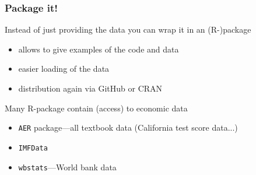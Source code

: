 \documentclass[ignorenonframetext]{beamer}
\begin{document}
\begin{frame}
  \frametitle{Package it!}
  Instead of just providing the data you can wrap it in an \alert{(R-)package}
  \begin{itemize}
    \item allows to give examples of the code and data
    \item easier loading of the data
    \item distribution again via \alert{GitHub} or CRAN\newline
  \end{itemize}
  Many R-package contain (access) to economic data
  \begin{itemize}
    \item \texttt{AER} package---all textbook data (California test score data...)
    \item \texttt{IMFData}
    \item \texttt{wbstats}---World bank data
  \end{itemize}

\end{frame}
\end{document}
